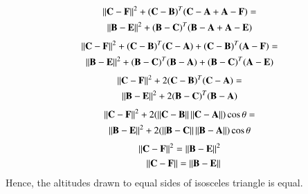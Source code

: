 \documentclass[journal,12pt,twocolumn]{IEEEtran}
\begin{document}
\begin{multline}
\left\lVert\mathbf{C-F}\right\rVert^2+\mathbf{(C-B)}^T\mathbf{(C-A+A-F)}=\\
\left\lVert\mathbf{B-E}\right\rVert^2+\mathbf{(B-C)}^T\mathbf{(B-A+A-E)}
\end{multline}
\begin{multline}
\left\lVert\mathbf{C-F}\right\rVert^2+\mathbf{(C-B)}^T\mathbf{(C-A)}+\mathbf{(C-B)}^T\mathbf{(A-F)}=\\
\left\lVert\mathbf{B-E}\right\rVert^2+\mathbf{(B-C)}^T\mathbf{(B-A)}+\mathbf{(B-C)}^T\mathbf{(A-E)}
\end{multline}
\begin{multline}
\left\lVert\mathbf{C-F}\right\rVert^2+2\mathbf{(C-B)}^T\mathbf{(C-A)}=\\
\left\lVert\mathbf{B-E}\right\rVert^2+2\mathbf{(B-C)}^T\mathbf{(B-A)}
\end{multline}
\begin{multline}
\left\lVert\mathbf{C-F}\right\rVert^2+2(\left\lVert\mathbf{C-B}\right\rVert\left\lVert\mathbf{C-A}\right\rVert)\cos\theta=\\
\left\lVert\mathbf{B-E}\right\rVert^2+2(\left\lVert\mathbf{B-C}\right\rVert\left\lVert\mathbf{B-A}\right\rVert)\cos\theta
\end{multline}
\begin{align}
\left\lVert\mathbf{C-F}\right\rVert^2=\left\lVert\mathbf{B-E}\right\rVert^2\\
\left\lVert\mathbf{C-F}\right\rVert=\left\lVert\mathbf{B-E}\right\rVert
\end{align}
Hence, the altitudes drawn to equal sides of isosceles triangle is equal.
 
\end{document}
